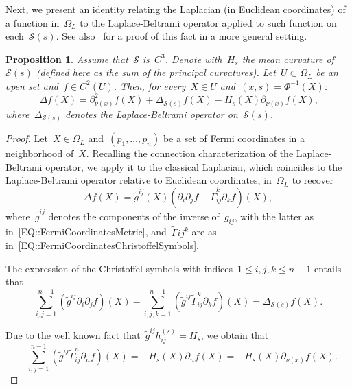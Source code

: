 \documentclass[12pt,a4paper]{amsart}
\numberwithin{equation}{section}
\newtheorem{proposition}[theorem]{Proposition}
\theoremstyle{definition}
\theoremstyle{remark}
\renewcommand{\leq}{\leqslant}
\begin{document}
\begin{appendix}
Next, we present an identity relating the Laplacian (in Euclidean coordinates) of a function in~$\Omega_L$ to the Laplace-Beltrami operator applied to such function on each~$\mathcal{S}(s)$. See also~\cite{MR2032110} for a proof of this fact in a more general setting.

\begin{proposition}\label{PROP::PacardLaplacianDecomposition}
    Assume that~$\mathcal{S}$ is~$C^3$. Denote with~$H_s$ the mean curvature of~$\mathcal{S}(s)$ (defined here as the sum of the principal curvatures). Let~$U \subset \Omega_L$ be an open set and~$f \in C^2(U)$. Then, for every~$X \in U$ and~$(x,s) = \Phi^{-1}(X)$:
    \begin{equation}
        \Delta f(X) = \partial^2_{\nu(x)}f(X) + \Delta_{\mathcal{S}(s)}f(X) - H_s(X) \partial_{\nu(x)}f(X)\text{,}
    \end{equation}
    where~$\Delta_{\mathcal{S}(s)}$ denotes the Laplace-Beltrami operator on~$\mathcal{S}(s)$.
\end{proposition}

\begin{proof}
    Let~$X \in \Omega_L$ and~$(p_1,\dots,p_n)$ be a set of Fermi coordinates in a neighborhood of~$X$. Recalling the connection characterization of the Laplace-Beltrami operator, we apply it to the classical Laplacian, which coincides to the Laplace-Beltrami operator relative to Euclidean coordinates, in~$\Omega_L$ to recover
    \begin{equation}\label{EQ::LaplaceBeltramiAllIndices}
        \Delta f(X) = \tilde{g}^{ij}(X) \left(\partial_i \partial_j f - \tilde{\Gamma}_{ij}^k \partial_k f\right)(X),
    \end{equation}
    where~$\tilde{g}^{ij}$ denotes the components of the inverse of~$\tilde{g}_{ij}$, with the latter as in~\eqref{EQ::FermiCoordinatesMetric}, and~$\tilde{\Gamma}{ij}^k$ are as in~\eqref{EQ::FermiCoordinatesChristoffelSymbols}.
    
    The expression of the Christoffel symbols with indices~$1\leq i,j,k \leq n-1$ entails that
    \begin{equation}\label{EQ::LaplaceBeltramiIndicesSigmaS}
        \sum_{i,j = 1}^{n-1}\left(\tilde{g}^{ij}\partial_i \partial_j f\right)(X) - \sum_{i,j,k = 1}^{n-1}\left(\tilde{g}^{ij}\tilde{\Gamma}_{ij}^k \partial_k f\right)(X) = \Delta_{\mathcal{S}(s)}f(X).
    \end{equation}

    Due to the well known fact that~$\tilde{g}^{ij} h_{ij}^{(s)} = H_s$, we obtain that
    \begin{equation}\label{EQ::LaplaceBeltramiIndicesCurvatureTerm}
        - \sum_{i,j = 1}^{n-1}\left(\tilde{g}^{ij}\tilde{\Gamma}_{ij}^n \partial_n f\right)(X) = - H_s(X) \partial_n f(X) = - H_s(X) \partial_{\nu(x)} f(X). 
    \end{equation}


\end{proof}
\end{appendix}
\end{document}
